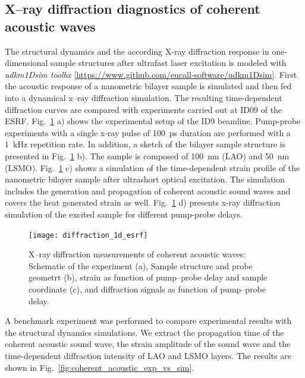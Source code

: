 \documentclass[10pt]{scrartcl}
\begin{document}
\subsection{X--ray diffraction diagnostics of coherent acoustic waves\label{sec:coherent_acoustic_phonons}}
The structural dynamics and the according X-ray diffraction response in
one-dimensional sample structures after ultrafast laser excitation is modeled
with \textit{udkm1Dsim toolbx} \cite{Schick2014}
[\url{https://www.github.com/eucall-software/udkm1Dsim}]. First the acoustic response of a
nanometric bilayer sample is simulated and then fed into a dynamical x--ray
diffraction simulation. The resulting time-dependent diffraction curves are
compared with experiments carried out at ID09 of the ESRF.
Fig.~\ref{fig:Id9_exp_conditions} a) shows the experimental setup of the ID9
beamline. Pump-probe experiments with a single x-ray pulse of
\SI{100}{\pico\second} duration
are performed with a \SI{1}{\kilo\hertz} repetition rate. In addition, a sketch of the bilayer
sample structure is presented in Fig.~\ref{fig:Id9_exp_conditions} b). The
sample is composed of \SI{100}{\nano\meter}  (LAO) and
\SI{50}{\nano\meter}  (LSMO).
Fig.~\ref{fig:Id9_exp_conditions} c) shows a simulation of the time-dependent
strain profile of the nanometric bilayer sample after ultrashort optical
excitation. The simulation includes the generation and propagation of coherent
acoustic sound waves and covers the heat generated strain  as well.
Fig.~\ref{fig:Id9_exp_conditions} d) presents x-ray diffraction simulation of
the excited sample for different pump-probe delays.

\begin{figure}[ht]
    \begin{center}
      \texttt{[image: diffraction\_1d\_esrf]}
    \end{center}
    \caption{X--ray diffraction measurements of coherent acoustic waves:
    Schematic of the experiment (a), Sample structure and probe geometrt (b),
  strain as function of pump--probe delay and sample coordinate (c), and
diffraction signals as function of pump--probe delay.}
    \label{fig:Id9_exp_conditions}
\end{figure}

A benchmark experiment was performed to compare experimental results with the structural dynamics simulations. We extract the propagation time of the coherent acoustic sound wave, the strain amplitude of the sound wave and the time-dependent diffraction intensity of LAO and LSMO  layers.
The results are shown in Fig.~\ref{fig:coherent_acoustic_exp_vs_sim}.
\end{document}
